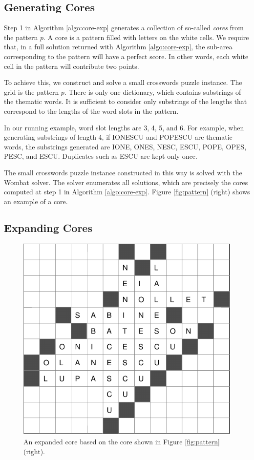 \subsection{Generating Cores}

Step 1 in Algorithm \ref{algo:core-exp} generates a collection of so-called \emph{cores} from the pattern $p$.
A core is a pattern filled with letters on the white cells.
We require that, in a full solution returned with Algorithm \ref{algo:core-exp}, 
the sub-area corresponding to the pattern will have a perfect score.
In other words, each white cell in the pattern will contribute two points.

To achieve this, we construct and solve a small crosswords puzzle instance.
The grid is the pattern $p$. There is only one dictionary, which contains 
substrings of the thematic words.
It is sufficient to consider only substrings of the lengths that 
correspond to the lengths of the word slots in the pattern.

In our running example, word slot lengths are 3, 4, 5, and 6.
For example, when generating substrings of length 4,
if IONESCU and POPESCU are thematic words,
the substrings generated are IONE, ONES, NESC, ESCU, POPE, OPES, PESC, and ESCU.
Duplicates such as ESCU are kept only once.

The small crosswords puzzle instance constructed in this way is 
solved with the {\sc Wombat} solver.
The solver enumerates all solutions, which are precisely the 
cores computed at step 1 in Algorithm \ref{algo:core-exp}.
Figure \ref{fig:pattern} (right) shows an example of a core.



\subsection{Expanding Cores}

\begin{figure}
\centering
\includegraphics[width=.45\textwidth]{_plots/extcore-alive-0-puzzle-72-2975-1488--1--1.pdf}
\caption{An expanded core based on the core shown in Figure \ref{fig:pattern} (right).}
\label{fig:exp-core}
\end{figure}


